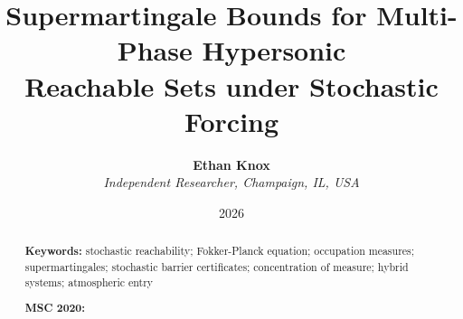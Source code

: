 \documentclass[english,11pt]{extarticle}
\begin{document}
\title{\textbf{Supermartingale Bounds for Multi-Phase Hypersonic\\
Reachable Sets under Stochastic Forcing}}
\author{\textbf{Ethan Knox}\\
\textit{Independent Researcher, Champaign, IL, USA}}
\date{2026}
\maketitle

\begin{abstract}



\bigskip{}

\textbf{Keywords:} stochastic reachability; Fokker-Planck equation;
occupation measures; supermartingales; stochastic barrier certificates;
concentration of measure; hybrid systems; atmospheric entry

\medskip{}
\noindent\textbf{MSC 2020: }

\end{abstract}
\pagebreak{}

\tableofcontents{}
\pagebreak{}

\pagebreak{}


\pagebreak{}


\pagebreak{}


\pagebreak{}


\pagebreak{}


\pagebreak{}


\pagebreak{}


\pagebreak{}


\pagebreak{}



\pagebreak{}

\appendix




\end{document}
